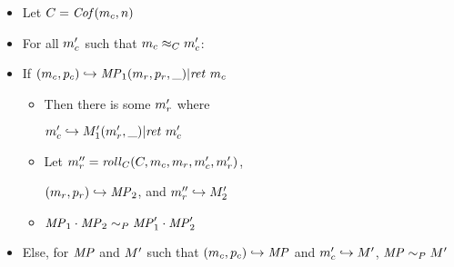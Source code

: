 \documentclass[conference]{IEEEtran}
\begin{document}
      \begin{itemize}
        \item Let \(C = \mathit{Cof}(m_c,n)\)
        \item For all \(m_c'\) such that \(m_c \approx_C m_c'\):
        \item If \((m_c,p_c) \hookrightarrow \mathit{MP}_1 (m_r,p_r,\_) | \mathit{ret}\ m_c\)
          \begin{itemize}
            \item Then there is some \(m_r'\) where

              \(m_c' \hookrightarrow M_1' (m_r',\_) | \mathit{ret}\ m_c'\)
            \item Let \(m_r'' = \mathit{roll}_C(C,m_c,m_r,m_c',m_r')\),

              \((m_r,p_r) \hookrightarrow \mathit{MP}_2\), and \(m_r'' \hookrightarrow M_2'\)
            \item \(\mathit{MP}_1 \cdot \mathit{MP}_2 \sim_P \mathit{MP}_1' \cdot \mathit{MP}_2'\)
          \end{itemize}
        \item Else, for \(\mathit{MP}\) and \(M'\) such that \((m_c,p_c) \hookrightarrow \mathit{MP}\)
          and \(m_c' \hookrightarrow M'\), \(\mathit{MP} \sim_P M'\)
      \end{itemize}
\end{document}
